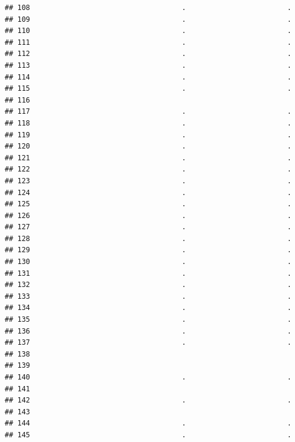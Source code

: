 \documentclass[
]{article}
\begin{document}
\begin{verbatim}
## 108                                    .                        .
## 109                                    .                        .
## 110                                    .                        .
## 111                                    .                        .
## 112                                    .                        .
## 113                                    .                        .
## 114                                    .                        .
## 115                                    .                        .
## 116                                                              
## 117                                    .                        .
## 118                                    .                        .
## 119                                    .                        .
## 120                                    .                        .
## 121                                    .                        .
## 122                                    .                        .
## 123                                    .                        .
## 124                                    .                        .
## 125                                    .                        .
## 126                                    .                        .
## 127                                    .                        .
## 128                                    .                        .
## 129                                    .                        .
## 130                                    .                        .
## 131                                    .                        .
## 132                                    .                        .
## 133                                    .                        .
## 134                                    .                        .
## 135                                    .                        .
## 136                                    .                        .
## 137                                    .                        .
## 138                                                              
## 139                                                              
## 140                                    .                        .
## 141                                                              
## 142                                    .                        .
## 143                                                              
## 144                                    .                        .
## 145                                    .                        .

\end{verbatim}
\end{document}
